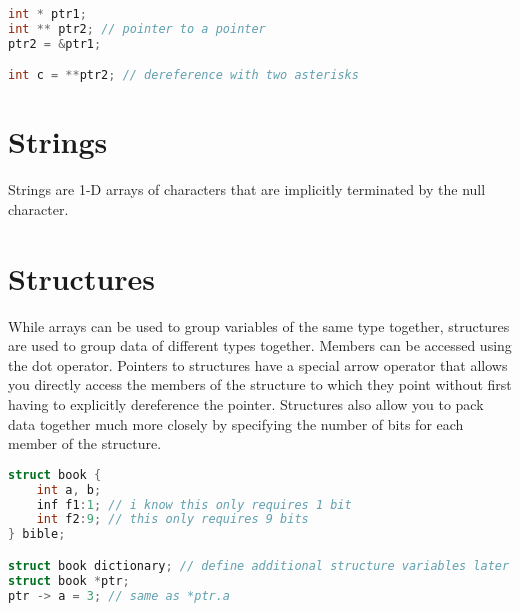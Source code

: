 \documentclass[10pt]{article}
\begin{document}
\begin{lstlisting}[language=C]
int * ptr1;
int ** ptr2; // pointer to a pointer
ptr2 = &ptr1;

int c = **ptr2; // dereference with two asterisks
\end{lstlisting}

\section{Strings}
Strings are 1-D arrays of characters that are implicitly terminated by the null character. 

\section{Structures}
While arrays can be used to group variables of the same type together, structures are used to group data of different types together. Members can be accessed using the dot operator. Pointers to structures have a special arrow operator that allows you directly access the members of the structure to which they point without first having to explicitly dereference the pointer. Structures also allow you to pack data together much more closely by specifying the number of bits for each member of the structure. 

\begin{lstlisting}[language=C]
struct book {
	int a, b;
	inf f1:1; // i know this only requires 1 bit
	int f2:9; // this only requires 9 bits
} bible;

struct book dictionary; // define additional structure variables later
struct book *ptr;
ptr -> a = 3; // same as *ptr.a
\end{lstlisting}
\end{document}
